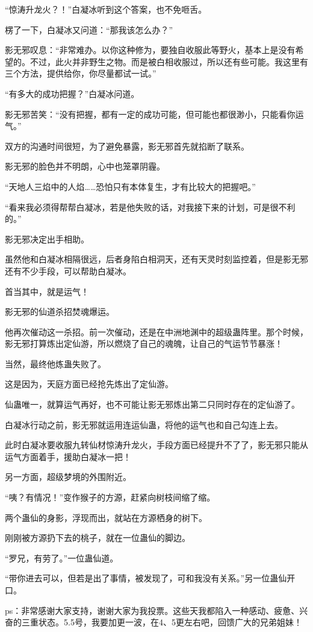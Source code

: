 \begin{this_body}
“惊涛升龙火？！”白凝冰听到这个答案，也不免咂舌。

楞了一下，白凝冰又问道：“那我该怎么办？”

影无邪叹息：“非常难办。以你这种修为，要独自收服此等野火，基本上是没有希望的。不过，此火并非野生之物。而是被白相收服过，所以还有些可能。我这里有三个方法，提供给你，你尽量都试一试。”

“有多大的成功把握？”白凝冰问道。

影无邪苦笑：“没有把握，都有一定的成功可能，但可能也都很渺小，只能看你运气。”

双方的沟通时间很短，为了避免暴露，影无邪首先就掐断了联系。

影无邪的脸色并不明朗，心中也笼罩阴霾。

“天地人三焰中的人焰……恐怕只有本体复生，才有比较大的把握吧。”

“看来我必须得帮帮白凝冰，若是他失败的话，对我接下来的计划，可是很不利的。”

影无邪决定出手相助。

虽然他和白凝冰相隔很远，后者身陷白相洞天，还有天灵时刻监控着，但是影无邪还有不少手段，可以帮助白凝冰。

首当其中，就是运气！

影无邪的仙道杀招焚魂爆运。

他再次催动这一杀招。前一次催动，还是在中洲地渊中的超级蛊阵里。那个时候，影无邪打算炼出定仙游，所以燃烧了自己的魂魄，让自己的气运节节暴涨！

当然，最终他炼蛊失败了。

这是因为，天庭方面已经抢先炼出了定仙游。

仙蛊唯一，就算运气再好，也不可能让影无邪炼出第二只同时存在的定仙游了。

白凝冰行动之前，影无邪就运用连运仙蛊，将他的运气也和自己勾连上去。

此时白凝冰要收服九转仙材惊涛升龙火，手段方面已经提升不了了，影无邪只能从运气方面着手，援助白凝冰一把！

另一方面，超级梦境的外围附近。

“咦？有情况！”变作猴子的方源，赶紧向树枝间缩了缩。

两个蛊仙的身影，浮现而出，就站在方源栖身的树下。

刚刚被方源扔下去的桃子，就在一位蛊仙的脚边。

“罗兄，有劳了。”一位蛊仙道。

“带你进去可以，但若是出了事情，被发现了，可和我没有关系。”另一位蛊仙开口。

ps：非常感谢大家支持，谢谢大家为我投票。这些天我都陷入一种感动、疲惫、兴奋的三重状态。5.5号，我要加更一波，在4、5更左右吧，回馈广大的兄弟姐妹！

\end{this_body}

